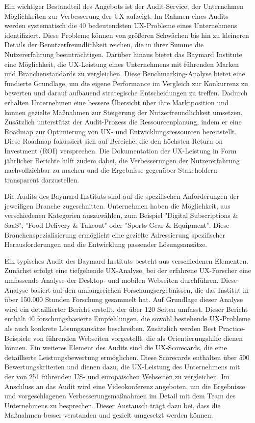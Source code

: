 Ein wichtiger Bestandteil des Angebots ist der Audit-Service, der Unternehmen Möglichkeiten zur Verbesserung der UX aufzeigt. Im Rahmen eines Audits werden systematisch die 40 bedeutendsten UX-Probleme eines Unternehmens identifiziert. Diese Probleme können von größeren Schwächen bis hin zu kleineren Details der Benutzerfreundlichkeit reichen, die in ihrer Summe die Nutzererfahrung beeinträchtigen. Darüber hinaus bietet das Baymard Institute eine Möglichkeit, die UX-Leistung eines Unternehmens mit führenden Marken und Branchenstandards zu vergleichen. Diese Benchmarking-Analyse bietet eine fundierte Grundlage, um die eigene Performance im Vergleich zur Konkurrenz zu bewerten und darauf aufbauend strategische Entscheidungen zu treffen. Dadurch erhalten Unternehmen eine bessere Übersicht über ihre Marktposition und können gezielte Maßnahmen zur Steigerung der Nutzerfreundlichkeit umsetzen. Zusätzlich unterstützt der Audit-Prozess die Ressourcenplanung, indem er eine Roadmap zur Optimierung von UX- und Entwicklungsressourcen bereitstellt. Diese Roadmap fokussiert sich auf Bereiche, die den höchsten Return on Investment (ROI) versprechen. Die Dokumentation der UX-Leistung in Form jährlicher Berichte hilft zudem dabei, die Verbesserungen der Nutzererfahrung nachvollziehbar zu machen und die Ergebnisse gegenüber Stakeholdern transparent darzustellen.

Die Audits des Baymard Instituts sind auf die spezifischen Anforderungen der jeweiligen Branche zugeschnitten. Unternehmen haben die Möglichkeit, aus verschiedenen Kategorien auszuwählen, zum Beispiel "Digital Subscriptions \& SaaS", "Food Delivery \& Takeout" oder "Sports Gear \& Equipment". Diese Branchenspezialisierung ermöglicht eine gezielte Adressierung spezifischer Herausforderungen und die Entwicklung passender Lösungsansätze.

Ein typisches Audit des Baymard Instituts besteht aus verschiedenen Elementen. Zunächst erfolgt eine tiefgehende UX-Analyse, bei der erfahrene UX-Forscher eine umfassende Analyse der Desktop- und mobilen Webseiten durchführen. Diese Analyse basiert auf den umfangreichen Forschungsergebnissen, die das Institut in über 150.000 Stunden Forschung gesammelt hat. Auf Grundlage dieser Analyse wird ein detaillierter Bericht erstellt, der über 120 Seiten umfasst. Dieser Bericht enthält 40 forschungsbasierte Empfehlungen, die sowohl bestehende UX-Probleme als auch konkrete Lösungsansätze beschreiben. Zusätzlich werden Best Practice-Beispiele von führenden Webseiten vorgestellt, die als Orientierungshilfe dienen können. Ein weiteres Element des Audits sind die UX-Scorecards, die eine detaillierte Leistungsbewertung ermöglichen. Diese Scorecards enthalten über 500 Bewertungskriterien und dienen dazu, die UX-Leistung des Unternehmens mit der von 251 führenden US- und europäischen Webseiten zu vergleichen. Im Anschluss an das Audit wird eine  Videokonferenz angeboten, um die Ergebnisse und vorgeschlagenen Verbesserungsmaßnahmen im Detail mit dem Team des Unternehmens zu besprechen. Dieser Austausch trägt dazu bei, dass die Maßnahmen besser verstanden und gezielt umgesetzt werden können.

